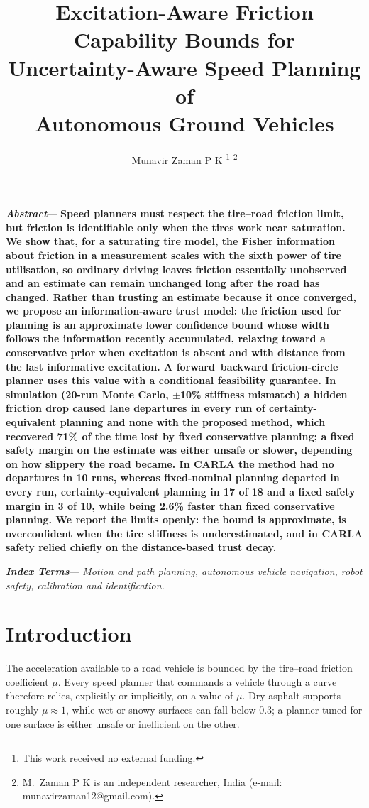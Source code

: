 \documentclass[letterpaper,journal,twoside]{IEEEtran}%
\title{Excitation-Aware Friction Capability Bounds for\\ Uncertainty-Aware Speed Planning of\\ Autonomous Ground Vehicles}
\author{Munavir Zaman P K%
\thanks{This work received no external funding.}%
\thanks{M.~Zaman P K is an independent researcher, India (e-mail: munavirzaman12@gmail.com).}}
\newenvironment{IEEEkeywords}{\par\noindent\textbf{\textit{Index Terms}}---\itshape}{\par}
\newcommand{\IEEEPARstart}[2]{#1#2}
\renewenvironment{abstract}{\par\noindent\textbf{\textit{Abstract}}---\bfseries\small}{\par}
\begin{document}
\maketitle

\begin{abstract}
Speed planners must respect the tire--road friction limit, but friction is identifiable only when the tires work near saturation. We show that, for a saturating tire model, the Fisher information about friction in a measurement scales with the sixth power of tire utilisation, so ordinary driving leaves friction essentially unobserved and an estimate can remain unchanged long after the road has changed. Rather than trusting an estimate because it once converged, we propose an information-aware trust model: the friction used for planning is an approximate lower confidence bound whose width follows the information recently accumulated, relaxing toward a conservative prior when excitation is absent and with distance from the last informative excitation. A forward--backward friction-circle planner uses this value with a conditional feasibility guarantee. In simulation (20-run Monte Carlo, $\pm$10\% stiffness mismatch) a hidden friction drop caused lane departures in every run of certainty-equivalent planning and none with the proposed method, which recovered 71\% of the time lost by fixed conservative planning; a fixed safety margin on the estimate was either unsafe or slower, depending on how slippery the road became. In CARLA the method had no departures in 10 runs, whereas fixed-nominal planning departed in every run, certainty-equivalent planning in 17 of 18 and a fixed safety margin in 3 of 10, while being 2.6\% faster than fixed conservative planning. We report the limits openly: the bound is approximate, is overconfident when the tire stiffness is underestimated, and in CARLA safety relied chiefly on the distance-based trust decay.
\end{abstract}

\begin{IEEEkeywords}
Motion and path planning, autonomous vehicle navigation, robot safety, calibration and identification.
\end{IEEEkeywords}

\section{Introduction}
\IEEEPARstart{T}{he} acceleration available to a road vehicle is bounded by the tire--road friction coefficient $\mu$. Every speed planner that commands a vehicle through a curve therefore relies, explicitly or implicitly, on a value of $\mu$. Dry asphalt supports roughly $\mu\approx1$, while wet or snowy surfaces can fall below $0.3$; a planner tuned for one surface is either unsafe or inefficient on the other.
\end{document}
